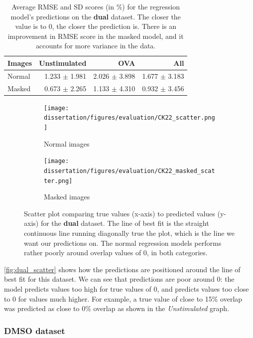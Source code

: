 \begin{table}[h!]
\centering
\caption{Average RMSE and SD scores (in \%) for the regression model's predictions on the \textbf{dual} dataset. The closer the value is to 0, the closer the prediction is. There is an improvement in RMSE score in the masked model, and it accounts for more variance in the data.}
\label{tab:dual_rmse}
\begin{tabular}{l|rr|r}
\rowcolor[HTML]{EFEFEF}
\textbf{Images} & \cellcolor[HTML]{FFCCC9}\textbf{Unstimulated} & \cellcolor[HTML]{C9FFCB}\textbf{OVA} & \textbf{All} \\ \hline
Normal      & 1.233 $\pm$ 1.981  & 2.026 $\pm$ 3.898  &   1.677 $\pm$ 3.183  \\ \hline
Masked      &    0.673 $\pm$ 2.265   &  1.133 $\pm$ 4.310   &   0.932 $\pm$ 3.456
\end{tabular}
\end{table}

\begin{figure}[bh!]
    \centering
    \begin{subfigure}{0.5\textwidth}
        \texttt{[image: dissertation/figures/evaluation/CK22\_scatter.png]}
        \caption{Normal images}
    \end{subfigure}
    \begin{subfigure}{0.5\textwidth}
        \texttt{[image: dissertation/figures/evaluation/CK22\_masked\_scatter.png]}
        \caption{Masked images}
    \end{subfigure}
    \caption{Scatter plot comparing true values (x-axis) to predicted values (y-axis) for the \textbf{dual} dataset. The line of best fit is the straight continuous line running diagonally true the plot, which is the line we want our predictions on. The normal regression models performs rather poorly around overlap values of 0, in both categories.}
    \label{fig:dual_scatter}
\end{figure}

\autoref{fig:dual_scatter} shows how the predictions are positioned around the line of best fit for this dataset. We can see that predictions are poor around 0: the model predicts values too high for true values of 0, and predicts values too close to 0 for values much higher. For example, a true value of close to 15\% overlap was predicted as close to 0\% overlap as shown in the \textit{Unstimulated} graph.

\bigskip
\subsubsection{DMSO dataset}
\hfill
\hfill

